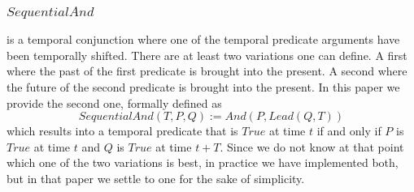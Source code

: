 \documentclass[runningheads]{llncs}
\newcommand{\SP}{\;\;\;}
\newcommand{\TTrue}{\textit{True}}
\newcommand{\TAnd}{\textit{And}}
\newcommand{\TSeqAnd}{\textit{SequentialAnd}}
\newcommand{\TBSeqAnd}{\textit{BackSequentialAnd}}
\newcommand{\TFSeqAnd}{\textit{ForeSequentialAnd}}
\newcommand{\TLag}{\textit{Lag}}
\newcommand{\TLead}{\textit{Lead}}
\begin{document}
\subsubsection{$\TSeqAnd$} is a temporal conjunction where one of the
temporal predicate arguments have been temporally shifted.  There are
at least two variations one can define.  A first where the past of the
first predicate is brought into the present.  A second where the
future of the second predicate is brought into the present.  In this
paper we provide the second one, formally defined as
$$\TSeqAnd(T, P, Q) := \TAnd(P, \TLead(Q, T))$$
which results into a temporal predicate that is $\TTrue$ at time $t$
if and only if $P$ is $\TTrue$ at time $t$ and $Q$ is $\TTrue$ at time
$t+T$.  Since we do not know at that point which one of the two
variations is best, in practice we have implemented both, but in that
paper we settle to one for the sake of simplicity.

\end{document}
